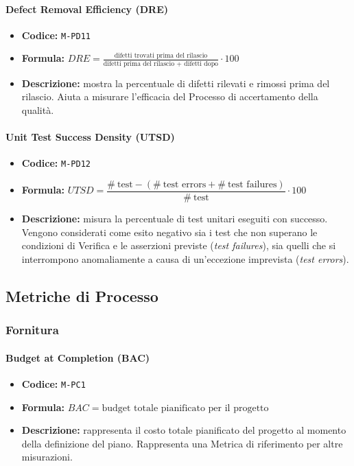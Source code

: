 \documentclass[a4paper,12pt]{article}
\begin{document}
\paragraph{Defect Removal Efficiency (DRE)}
\begin{itemize}
    \item \textbf{Codice:} \texttt{M-PD11}
        \item \textbf{Formula:} $DRE=\frac{\text{difetti trovati prima del rilascio}}{\text{difetti prima del rilascio + difetti dopo}}\cdot 100$
    \item \textbf{Descrizione:} mostra la percentuale di difetti rilevati e rimossi prima del rilascio. Aiuta a misurare l'efficacia del Processo di accertamento della qualità. 
\end{itemize}

\paragraph{Unit Test Success Density (UTSD)}
\begin{itemize}
\item \textbf{Codice:} \texttt{M-PD12}
\item \textbf{Formula:} $UTSD = \dfrac{\#\ \text{test} - (\#\ \text{test errors} + 
\#\ \text{test failures})}{\#\ \text{test}} \cdot 100$
\item \textbf{Descrizione:} misura la percentuale di test unitari eseguiti con 
successo. Vengono considerati come esito negativo sia i test che non superano 
le condizioni di Verifica e le asserzioni previste (\textit{test failures}), 
sia quelli che si interrompono anomaliamente a causa di un'eccezione imprevista (\textit{test errors}).
\end{itemize}

\subsection{Metriche di Processo}

\subsubsection{Fornitura}

\paragraph{Budget at Completion (BAC)}
\begin{itemize}
    \item \textbf{Codice:} \texttt{M-PC1}
    \item \textbf{Formula:} $BAC=\text{budget totale pianificato per il progetto}$
    \item \textbf{Descrizione:} rappresenta il costo totale pianificato del progetto al momento della definizione del piano. Rappresenta una Metrica di riferimento per altre misurazioni.
\end{itemize}
\end{document}
